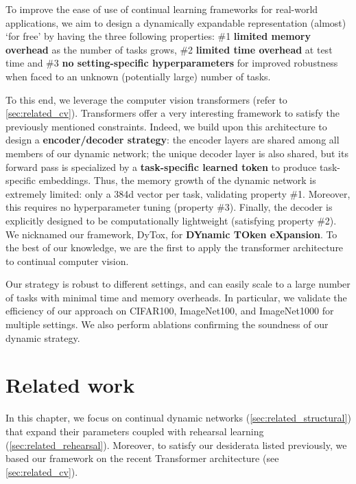 To improve the ease of use of continual learning frameworks for real-world applications, we aim to
design a dynamically expandable representation (almost) `for free' by having the three following
properties: \#1 \textbf{limited memory overhead} as the number of tasks grows, \#2 \textbf{limited
    time overhead} at test time and \#3 \textbf{no setting-specific hyperparameters} for improved
robustness when faced to an unknown (potentially large) number of tasks.

To this end, we leverage the computer vision transformers (refer to \autoref{sec:related_cv}).
Transformers \citep{vaswani2017transformer} offer a very interesting framework to satisfy the
previously mentioned constraints. Indeed, we build upon this architecture to design a
\textbf{encoder/decoder strategy}: the encoder layers are shared among all members of our dynamic
network; the unique decoder layer is also shared, but its forward pass is specialized by a
\textbf{task-specific learned token} to produce task-specific embeddings. Thus, the memory growth of
the dynamic network is extremely limited: only a 384d vector per task, validating property \#1.
Moreover, this requires no hyperparameter tuning (property \#3). Finally, the decoder is explicitly
designed to be computationally lightweight (satisfying property \#2). We nicknamed our framework,
DyTox, for \textbf{DYnamic TOken eXpansion}. To the best of our knowledge, we are the first to apply
the transformer architecture to continual computer vision.

Our strategy is robust to different settings, and can easily scale to a large number of tasks with
minimal time and memory overheads. In particular, we validate the efficiency of our approach on
CIFAR100, ImageNet100, and ImageNet1000 for multiple settings. We also perform ablations confirming
the soundness of our dynamic strategy.

\section{Related work}
\label{sec:dytox_related}

In this chapter, we focus on continual dynamic networks
(\autoref{sec:related_structural}) that expand their parameters coupled with rehearsal learning
(\autoref{sec:related_rehearsal}). Moreover, to satisfy our desiderata listed previously, we based
our framework on the recent Transformer architecture (see \autoref{sec:related_cv}).

